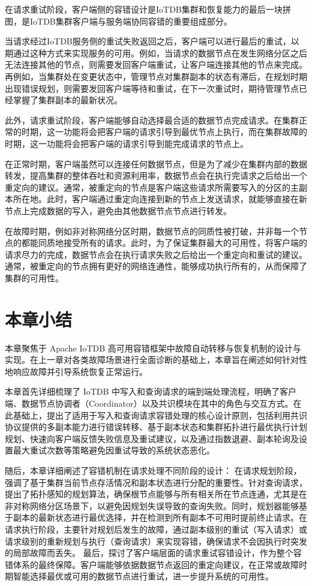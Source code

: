 在请求重试阶段，客户端侧的容错设计是IoTDB集群\failover 和恢复能力的最后一块拼图，是IoTDB集群客户端与服务端协同容错的重要组成部分。

当请求经过IoTDB服务侧的重试失败返回之后，客户端可以进行最后的重试，以期通过这种方式来实现服务的可用。例如，当请求的数据节点在发生网络分区之后无法连接其他的节点，则需要发回客户端重试，让客户端连接其他的节点来完成。再例如，当集群处在变更状态中，管理节点对集群副本的状态有滞后，在规划时期出现错误规划，则需要发回客户端等待和重试，在下一次重试时，期待管理节点已经掌握了集群副本的最新状况。

此外，请求重试阶段，客户端能够自动选择最合适的数据节点完成请求。在集群正常的时期，这一功能将会把客户端的请求引导到最优节点上执行，而在集群故障的时期，这一功能将会把客户端的请求引导到能完成请求的节点上。

在正常时期，客户端虽然可以连接任何数据节点，但是为了减少在集群内部的数据转发，提高集群的整体吞吐和资源利用率，数据节点会在执行完请求之后给出一个重定向的建议。通常，被重定向的节点是客户端这些请求所需要写入的分区的主副本所在地。此时，客户端通过重定向连接到新的节点上发送请求，就能够直接在新节点上完成数据的写入，避免由其他数据节点节点进行转发。

在故障时期，例如非对称网络分区时期，数据节点的同质性被打破，并非每一个节点的都能同质地接受所有的请求。此时，为了保证集群最大的可用性，将客户端的请求尽力的完成，数据节点会在执行请求失败之后给出一个重定向和重试的建议。通常，被重定向的节点拥有更好的网络连通性，能够成功执行所有的\fragmentinstance ，从而保障了集群的可用性。

\section{本章小结}

本章聚焦于 Apache IoTDB 高可用容错框架中故障自动转移与恢复机制的设计与实现。在上一章对各类故障场景进行全面诊断的基础上，本章旨在阐述如何针对性地响应故障并引导系统恢复正常运行。

本章首先详细梳理了 IoTDB 中写入和查询请求的端到端处理流程，明确了客户端、数据节点协调者（Coordinator）以及共识模块在其中的角色与交互方式。在此基础上，提出了适用于写入和查询请求容错处理的核心设计原则，包括利用共识协议提供的多副本能力进行错误转移、基于副本状态和集群拓扑进行最优执行计划规划、快速向客户端反馈失败信息及重试建议，以及通过指数退避、副本轮询及设置最大重试次数等策略避免因重试导致的系统状态恶化。

随后，本章详细阐述了容错机制在请求处理不同阶段的设计：
在请求规划阶段，强调了基于集群当前节点存活情况和副本状态进行\fragmentinstance 分配的重要性。针对查询请求，提出了拓扑感知的规划算法，确保根节点\fragmentinstance 能够与所有相关\fragmentinstance 所在节点连通，尤其是在非对称网络分区场景下，以避免因规划失误导致的查询失败。同时，规划器能够基于副本的最新状态进行最优选择，并在检测到所有副本不可用时提前终止请求。在请求执行阶段，主要针对规划后发生的故障，通过副本级别的重试（写入请求）或请求级别的重新规划与执行（查询请求）来实现容错，确保请求不会因执行时突发的局部故障而丢失。
最后，探讨了客户端层面的请求重试容错设计，作为整个容错体系的最终保障。客户端能够依据数据节点返回的重定向建议，在正常或故障时期智能选择最优或可用的数据节点进行重试，进一步提升系统的可用性。